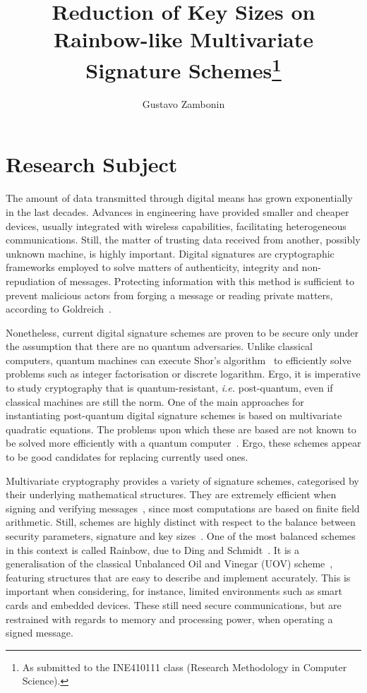 \documentclass[10pt]{article}
\title{Reduction of Key Sizes on Rainbow-like Multivariate Signature
    Schemes\footnote{As submitted to the INE410111 class (Research Methodology
    in Computer Science).}}
\author{Gustavo Zambonin\inst{1}}
\begin{document}
\maketitle

\section{Research Subject}

The amount of data transmitted through digital means has grown exponentially in
the last decades. Advances in engineering have provided smaller and cheaper
devices, usually integrated with wireless capabilities, facilitating
heterogeneous communications. Still, the matter of trusting data received from
another, possibly unknown machine, is highly important. Digital signatures are
cryptographic frameworks employed to solve matters of authenticity, integrity
and non-repudiation of messages. Protecting information with this method is
sufficient to prevent malicious actors from forging a message or reading
private matters, according to Goldreich~\cite{Goldreich:book:2004}.

Nonetheless, current digital signature schemes are proven to be secure only
under the assumption that there are no quantum adversaries. Unlike classical
computers, quantum machines can execute Shor's
algorithm~\cite{Shor:article:1997:oct} to efficiently solve problems such as
integer factorisation or discrete logarithm. Ergo, it is imperative to study
cryptography that is quantum-resistant, \emph{i.e.} post-quantum, even if
classical machines are still the norm. One of the main approaches for
instantiating post-quantum digital signature schemes is based on multivariate
quadratic equations. The problems upon which these are based are not known to
be solved more efficiently with a quantum computer~\cite{Bernstein:book:2008}.
Ergo, these schemes appear to be good candidates for replacing currently used
ones.

Multivariate cryptography provides a variety of signature schemes, categorised
by their underlying mathematical structures. They are extremely efficient when
signing and verifying messages~\cite{Ding:book:2006}, since most computations
are based on finite field arithmetic. Still, schemes are highly distinct with
respect to the balance between security parameters, signature and key
sizes~\cite{Ding:article:2017:jul}. One of the most balanced schemes in this
context is called Rainbow, due to Ding and Schmidt~\cite{Ding:inproc:2005:jun}.
It is a generalisation of the classical Unbalanced Oil and Vinegar (UOV)
scheme~\cite{Kipnis:inproc:1999:apr}, featuring structures that are easy to
describe and implement accurately. This is important when considering, for
instance, limited environments such as smart cards and embedded devices. These
still need secure communications, but are restrained with regards to memory and
processing power, when operating a signed message.
\end{document}
